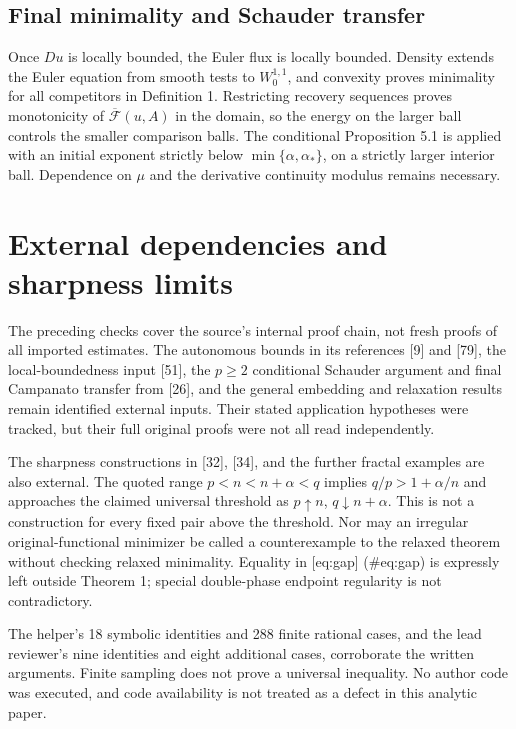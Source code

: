 \documentclass[10pt]{article}
\begin{document}
\subsection*{Final minimality and Schauder transfer}
Once \(Du\) is locally bounded, the Euler flux is locally bounded. Density extends the Euler equation from smooth tests to \(W_0^{1,1}\), and convexity proves minimality for all competitors in Definition 1. Restricting recovery sequences proves monotonicity of \(\overline{\mathcal F}(u,A)\) in the domain, so the energy on the larger ball controls the smaller comparison balls. The conditional Proposition 5.1 is applied with an initial exponent strictly below \(\min\{\alpha,\alpha_*\}\), on a strictly larger interior ball. Dependence on \(\mu\) and the derivative continuity modulus remains necessary.\par
\section*{External dependencies and sharpness limits}
The preceding checks cover the source’s internal proof chain, not fresh proofs of all imported estimates. The autonomous bounds in its references [9] and [79], the local-boundedness input [51], the \(p\geq2\) conditional Schauder argument and final Campanato transfer from [26], and the general embedding and relaxation results remain identified external inputs. Their stated application hypotheses were tracked, but their full original proofs were not all read independently.\par
The sharpness constructions in [32], [34], and the further fractal examples are also external. The quoted range \(p<n<n+\alpha<q\) implies \(q/p>1+\alpha/n\) and approaches the claimed universal threshold as \(p\uparrow n\), \(q\downarrow n+\alpha\). This is not a construction for every fixed pair above the threshold. Nor may an irregular original-functional minimizer be called a counterexample to the relaxed theorem without checking relaxed minimality. Equality in [eq:gap] (\#eq:gap) is expressly left outside Theorem 1; special double-phase endpoint regularity is not contradictory.\par
The helper’s 18 symbolic identities and 288 finite rational cases, and the lead reviewer’s nine identities and eight additional cases, corroborate the written arguments. Finite sampling does not prove a universal inequality. No author code was executed, and code availability is not treated as a defect in this analytic paper.\par
\end{document}
